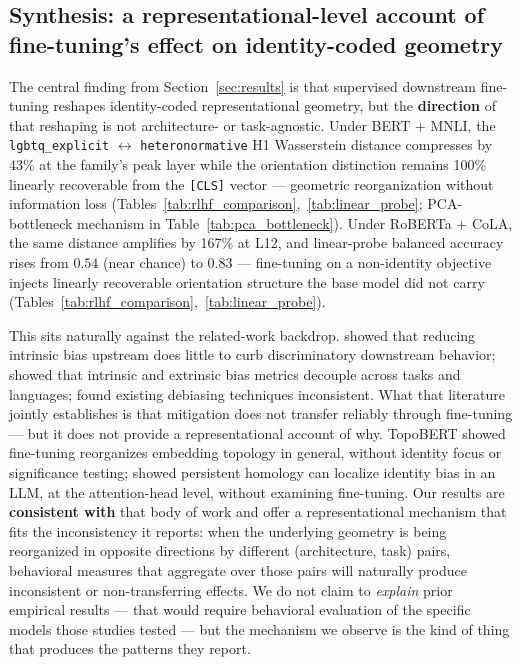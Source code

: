 \documentclass[11pt]{article}
\begin{document}
\subsection{Synthesis: a representational-level account of fine-tuning's effect on identity-coded geometry}\label{sec:synthesis}

The central finding from Section~\ref{sec:results} is that supervised downstream fine-tuning reshapes identity-coded representational geometry, but the \textbf{direction} of that reshaping is not architecture- or task-agnostic. Under BERT + MNLI, the \texttt{lgbtq\_explicit} $\leftrightarrow$ \texttt{heteronormative} H1 Wasserstein distance compresses by 43\% at the family's peak layer while the orientation distinction remains 100\% linearly recoverable from the \texttt{[CLS]} vector --- geometric reorganization without information loss (Tables~\ref{tab:rlhf_comparison},~\ref{tab:linear_probe}; PCA-bottleneck mechanism in Table~\ref{tab:pca_bottleneck}). Under RoBERTa + CoLA, the same distance amplifies by 167\% at L12, and linear-probe balanced accuracy rises from $0.54$ (near chance) to $0.83$ --- fine-tuning on a non-identity objective injects linearly recoverable orientation structure the base model did not carry (Tables~\ref{tab:rlhf_comparison},~\ref{tab:linear_probe}).

This sits naturally against the related-work backdrop. \citet{steed-etal-2022-upstream} showed that reducing intrinsic bias upstream does little to curb discriminatory downstream behavior; \citet{goldfarb-tarrant-etal-2021-intrinsic} showed that intrinsic and extrinsic bias metrics decouple across tasks and languages; \citet{meade-etal-2022-empirical} found existing debiasing techniques inconsistent. What that literature jointly establishes is that mitigation does not transfer reliably through fine-tuning --- but it does not provide a representational account of why. TopoBERT \citep{rathore2023topobert} showed fine-tuning reorganizes embedding topology in general, without identity focus or significance testing; \citet{varadarajan2025augmenting} showed persistent homology can localize identity bias in an LLM, at the attention-head level, without examining fine-tuning. Our results are \textbf{consistent with} that body of work and offer a representational mechanism that fits the inconsistency it reports: when the underlying geometry is being reorganized in opposite directions by different (architecture, task) pairs, behavioral measures that aggregate over those pairs will naturally produce inconsistent or non-transferring effects. We do not claim to \textit{explain} prior empirical results --- that would require behavioral evaluation of the specific models those studies tested --- but the mechanism we observe is the kind of thing that produces the patterns they report.
\end{document}
